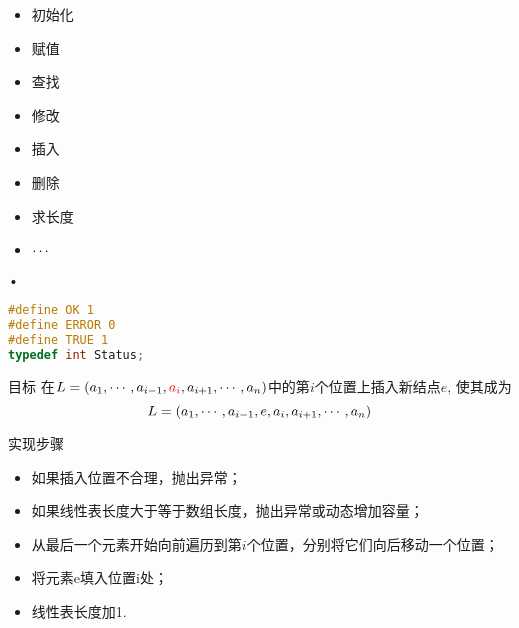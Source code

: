 \begin{frame}\ft{\subsecname}
\begin{itemize}
\item
初始化
\item
赋值
\item
查找
\item
修改
\item
插入
\item
删除
\item
求长度
\item
$\cdots$
\end{itemize}•
\end{frame}


\begin{frame}[fragile]\ft{\subsecname}
  \begin{lstlisting}[frame=tb,language=C]
#define OK 1
#define ERROR 0
#define TRUE 1
typedef int Status;
  \end{lstlisting}
\end{frame}

\begin{frame}[fragile]\ft{\subsecname}

\end{frame}

\begin{frame}[fragile]\ft{\subsecname}
\begin{block}{目标}
在$L=(a_1,\cdots,a_{i-1},\textcolor{red}{a_i},a_{i+1},\cdots,a_n)$中的第$i$个位置上插入新结点$e$,  使其成为
$$
L=(a_1,\cdots,a_{i-1},e,a_i,a_{i+1},\cdots,a_n)
$$
\end{block}
\pause 
\begin{block}{实现步骤}
\begin{itemize}
\item
  如果插入位置不合理，抛出异常；
\item
  如果线性表长度大于等于数组长度，抛出异常或动态增加容量；
\item
  从最后一个元素开始向前遍历到第$i$个位置，分别将它们向后移动一个位置；
\item
  将元素{\ttfamily e}填入位置{\ttfamily i}处；
\item
线性表长度加1.
\end{itemize}
\end{block}

\end{frame}

\begin{frame}[fragile]\ft{\subsecname}

\end{frame}

